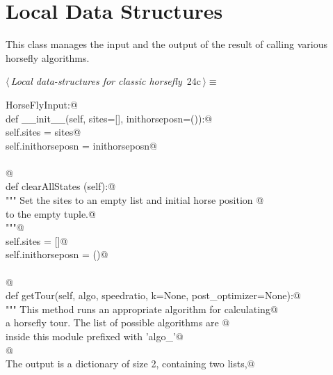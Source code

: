 \documentclass[11.5pt]{report}
\begin{document}
\section{Local Data Structures}

\newchunk This class manages the input and the output of the result of 
calling various horsefly algorithms. 

\begin{flushleft} \small\label{scrap29}\raggedright\small
{} $\langle\,${\itshape Local data-structures for classic horsefly}\nobreak\ {\footnotesize {24c}}$\,\rangle\equiv$
\vspace{-1ex}
\begin{list}{}{} \item
\mbox{}\verb@class HorseFlyInput:@\\
\mbox{}\verb@      def __init__(self, sites=[], inithorseposn=()):@\\
\mbox{}\verb@           self.sites         = sites@\\
\mbox{}\verb@           self.inithorseposn = inithorseposn@\\
\mbox{}\verb@@\\
\mbox{}\verb@           @\\
\mbox{}\verb@      def clearAllStates (self):@\\
\mbox{}\verb@          """ Set the sites to an empty list and initial horse position @\\
\mbox{}\verb@          to the empty tuple.@\\
\mbox{}\verb@          """@\\
\mbox{}\verb@          self.sites = []@\\
\mbox{}\verb@          self.inithorseposn = ()@\\
\mbox{}\verb@@\\
\mbox{}\verb@          @\\
\mbox{}\verb@      def getTour(self, algo, speedratio, k=None, post_optimizer=None):@\\
\mbox{}\verb@          """ This method runs an appropriate algorithm for calculating@\\
\mbox{}\verb@          a horsefly tour. The list of possible algorithms are @\\
\mbox{}\verb@          inside this module prefixed with 'algo_'@\\
\mbox{}\verb@          @\\
\mbox{}\verb@          The output is a dictionary of size 2, containing two lists,@\\

\end{list}
\end{flushleft}
\end{document}
